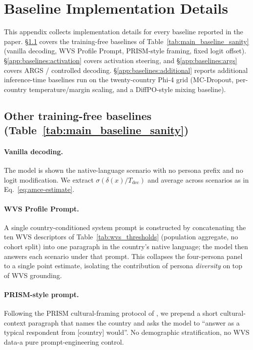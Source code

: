 \documentclass{article}
\begin{document}
\section{Baseline Implementation Details}
\label{app:r2_baselines}
\label{app:baselines}

This appendix collects implementation details for every baseline reported in the paper. \S\ref{app:baselines:sanity} covers the training-free baselines of Table~\ref{tab:main_baseline_sanity} (vanilla decoding, WVS Profile Prompt, PRISM-style framing, fixed logit offset). \S\ref{app:baselines:activation} covers activation steering, and \S\ref{app:baselines:args} covers ARGS / controlled decoding. \S\ref{app:baselines:additional} reports additional inference-time baselines run on the twenty-country Phi-4 grid (MC-Dropout, per-country temperature/margin scaling, and a DiffPO-style mixing baseline).

\subsection{Other training-free baselines (Table~\ref{tab:main_baseline_sanity})}
\label{app:baselines:sanity}

\paragraph{Vanilla decoding.} The model is shown the native-language scenario with no persona prefix and no logit modification. We extract $\sigma(\delta(x)/T_{\text{dec}})$ and average across scenarios as in Eq.~\ref{eq:amce-estimate}.

\paragraph{WVS Profile Prompt.} A single country-conditioned system prompt is constructed by concatenating the ten WVS descriptors of Table~\ref{tab:wvs_thresholds} (population aggregate, no cohort split) into one paragraph in the country's native language; the model then answers each scenario under that prompt. This collapses the four-persona panel to a single point estimate, isolating the contribution of persona \emph{diversity} on top of WVS grounding.

\paragraph{PRISM-style prompt.} Following the PRISM cultural-framing protocol of \citet{kirk2024prism}, we prepend a short cultural-context paragraph that names the country and asks the model to ``answer as a typical respondent from [country] would''. No demographic stratification, no WVS data-a pure prompt-engineering control.
\end{document}
